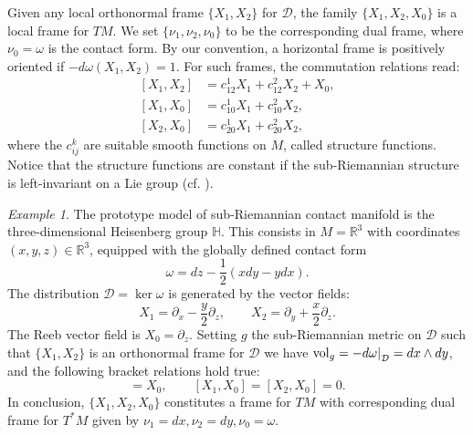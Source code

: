 \documentclass{amsart}
\theoremstyle{plain}
\theoremstyle{definition}
\theoremstyle{remark}
\newtheorem{example}[thm]{Example}
\newcommand{\R}{\mathbb{R}}
\newcommand{\diff}{d}%
\newcommand{\p}{\partial}												%
\newcommand{\sr}{sub-{R}ie\-man\-nian }
\newcommand{\distr}{\mathcal{D}}								%
\newcommand\restr[2]{{													%
  \left.\kern-\nulldelimiterspace 					
  #1 																			
  \right|_{#2} 														
  }}
\begin{document}
Given any local orthonormal frame $\{X_1, X_2\}$ for $\distr$, the family $\{X_1, X_2,X_0\}$ is a local frame for $TM$. We set $\{\nu_1,\nu_2,\nu_{0}\}$ to be the corresponding dual frame, where $\nu_{0}=\omega$ is  the contact form.
By our convention, a horizontal frame is positively oriented if $-\diff\omega(X_1,X_2)=1$. For such frames, the commutation relations read:
\begin{equation}\label{eq:structurecoeff}
\begin{split}
\left[X_{1},X_{2}\right] & =c_{12}^{1}X_{1}+c_{12}^{2}X_{2}+X_{0}, \\
\left[X_{1},X_{0}\right] & =c_{10}^{1}X_{1}+c_{10}^{2}X_{2},\\
\left[X_{2},X_{0}\right] & =c_{20}^{1}X_{1}+c_{20}^{2}X_{2},
\end{split} 
\end{equation}
where the $c_{ij}^{k}$ are suitable smooth functions on $M$, called structure functions. Notice that the  structure functions are constant if the \sr structure is left-invariant on a Lie group (cf. \cite[Section~7.4]{thebook}).
\begin{example}
\label{ex:Heisenberg}
The prototype model of \sr contact manifold is the three-di\-men\-sio\-nal Heisenberg group $\mathbb{H}$. 
This consists in $M=\R^3$ with coordinates $(x,y,z)\in\R^3$, equipped with the globally defined contact form
\begin{equation}
\label{eq:contactformH}
\omega=dz-\frac{1}{2}(xdy-ydx).
\end{equation}
The distribution $\distr=\ker \omega$ is generated by the vector fields:
\begin{equation}
X_1=\p _x-\dfrac{y}{2}\p _z,  
\qquad 
X_2=\p _y+\dfrac{x}{2}\p _z.
\end{equation}
The Reeb vector field is $X_0=\p_z$. 
Setting $g$ the \sr metric on $\distr$ such that $\{X_1,X_2\}$ is an orthonormal frame for $\distr$ we have $\mathrm{vol}_g=-\restr{\diff\omega}{\distr}=dx\wedge dy$,  and  the following bracket relations hold true:
\begin{equation}
[X_1,X_2]=X_0, \qquad [X_1,X_0]=[X_2,X_0]=0.
\end{equation}
In conclusion, $\{X_1,X_2,X_0\}$ constitutes a frame for $TM$ with corresponding dual frame for $T^*M$ given by $\nu_1=dx, \nu_2=dy, \nu_{0}=\omega$.

\end{example}
\end{document}
